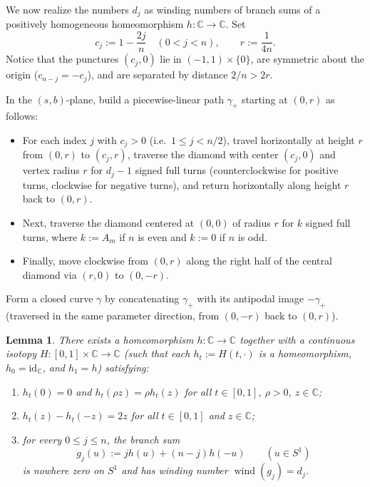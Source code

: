 \documentclass[11pt,a4paper]{amsart}
\numberwithin{equation}{section}
\newtheorem{lemma}[theorem]{Lemma}
\theoremstyle{definition}
\newcommand{\C}{\mathbb{C}}
\newcommand{\wind}{\operatorname{wind}}
\begin{document}
We now realize the numbers $d_j$ as winding numbers of branch sums of a positively homogeneous homeomorphism $h : \C \to \C$. Set
\[
c_j := 1 - \frac{2j}{n} \quad (0 < j < n), \qquad r := \frac{1}{4n}.
\]
Notice that the punctures $(c_j, 0)$ lie in $(-1, 1) \times \{0\}$, are symmetric about the origin ($c_{n-j} = -c_j$), and are separated by distance $2/n > 2r$.

In the $(s,b)$-plane, build a piecewise-linear path $\gamma_+$ starting at $(0,r)$ as follows:
\begin{itemize}
\item For each index $j$ with $c_j > 0$ (i.e.\ $1 \le j < n/2$), travel horizontally at height $r$ from $(0,r)$ to $(c_j, r)$, traverse the diamond with center $(c_j, 0)$ and vertex radius $r$ for $d_j - 1$ signed full turns (counterclockwise for positive turns, clockwise for negative turns), and return horizontally along height $r$ back to $(0,r)$.
\item Next, traverse the diamond centered at $(0,0)$ of radius $r$ for $k$ signed full turns, where $k := A_m$ if $n$ is even and $k := 0$ if $n$ is odd.
\item Finally, move clockwise from $(0,r)$ along the right half of the central diamond via $(r,0)$ to $(0,-r)$.
\end{itemize}
Form a closed curve $\gamma$ by concatenating $\gamma_+$ with its antipodal image $-\gamma_+$ (traversed in the same parameter direction, from $(0,-r)$ back to $(0,r)$).

\begin{lemma}
\label{lem:homeo-h}
There exists a homeomorphism $h : \C \to \C$ together with a continuous isotopy $H : [0,1] \times \C \to \C$ (such that each $h_t := H(t,\cdot)$ is a homeomorphism, $h_0 = \mathrm{id}_\C$, and $h_1 = h$) satisfying:
\begin{enumerate}[label=\textup{(\alph*)}]
\item $h_t(0) = 0$ and $h_t(\rho z) = \rho h_t(z)$ for all $t \in [0,1]$, $\rho > 0$, $z \in \C$;
\item $h_t(z) - h_t(-z) = 2z$ for all $t \in [0,1]$ and $z \in \C$;
\item for every $0 \le j \le n$, the branch sum
\[
g_j(u) := j h(u) + (n-j) h(-u) \qquad (u \in S^1)
\]
is nowhere zero on $S^1$ and has winding number $\wind(g_j) = d_j$.
\end{enumerate}
\end{lemma}
\end{document}
